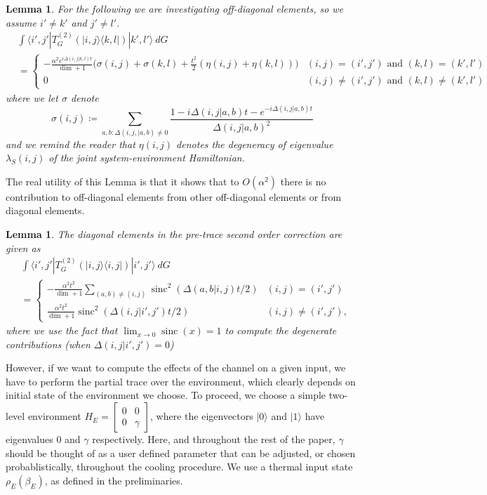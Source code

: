 \documentclass{article}
\newtheorem{lemma}[theorem]{Lemma}
\newcommand{\ket}[1]{|#1\rangle}
\newcommand{\bra}[1]{\langle #1|}
\newcommand{\ketbra}[2]{| #1\rangle\! \langle #2|}
\DeclareMathOperator{\sinc}{sinc}
\begin{document}
\begin{lemma}
     For the following we are investigating off-diagonal elements, so we assume $i' \neq k'$ and $j' \neq l'$.
    \begin{align}
    &\int \bra{i', j'}  T^{(2)}_G \left( \ketbra{i, j}{k, l} \right) \ket{k', l'} ~dG \\
    &=\begin{cases}
        -\frac{\alpha^2 e^{i \Delta(i,j|k,l) t}}{\dim + 1} \bigg( \sigma(i,j) + \sigma(k,l) + \frac{t^2}{2}(\eta(i,j) + \eta(k,l)) \bigg) & (i, j) = (i', j') \text{ and } (k, l) = (k', l') \\
        0 & (i, j) \neq (i', j') \text{ and } (k, l) \neq (k', l')
    \end{cases}
    \end{align}
    where we let $\sigma$ denote
    \begin{equation}
        \sigma(i,j) \coloneqq \sum_{a,b: \Delta(i,j,|a,b) \neq 0} \frac{1 - i \Delta(i,j|a,b)t - e^{-i \Delta(i,j|a,b) t}}{\Delta(i,j|a,b)^2}
    \end{equation}
    and we remind the reader that $\eta(i,j)$ denotes the degeneracy of eigenvalue $\lambda_S(i,j)$ of the joint system-environment Hamiltonian. 
\end{lemma}
The real utility of this Lemma is that it shows that to $O(\alpha^2)$ there is no contribution to off-diagonal elements from other off-diagonal elements or from diagonal elements.
\begin{lemma}
    The diagonal elements in the pre-trace second order correction are given as
    \begin{align}
        &\int \bra{i', j'} T^{(2)}_G \left( \ketbra{i, j}{i, j} \right) \ket{i', j'} ~dG \\
        &= \begin{cases}
            - \frac{\alpha^2 t^2 }{\dim + 1} \sum_{(a,b) \neq (i, j)} \sinc^2(\Delta(a,b|i,j) t / 2) & (i,j) = (i', j') \\
    \frac{\alpha^2 t^2 }{\dim + 1} \sinc^2(\Delta(i,j | i', j') t /2) & (i, j) \neq (i', j'),
        \end{cases} \label{eq:second_order_transitions_final_final}
    \end{align}
    where we use the fact that $\lim_{x \to 0} \sinc(x) = 1$ to compute the degenerate contributions (when $\Delta(i, j | i', j') = 0$)
\end{lemma}
However, if we want to compute the effects of the channel on a given input, we have to perform the partial trace over the environment, which clearly depends on initial state of the environment we choose. To proceed, we choose a simple two-level environment $H_E = \begin{bmatrix}
    0 & 0 \\ 0 & \gamma
\end{bmatrix}$, where the eigenvectors $\ket{0}$ and $\ket{1}$ have eigenvalues 0 and $\gamma$ respectively. Here, and throughout the rest of the paper, $\gamma$ should be thought of as a user defined parameter that can be adjusted, or chosen probablistically, throughout the cooling procedure. We use a thermal input state $\rho_E(\beta_E)$, as defined in the preliminaries. 
\end{document}
